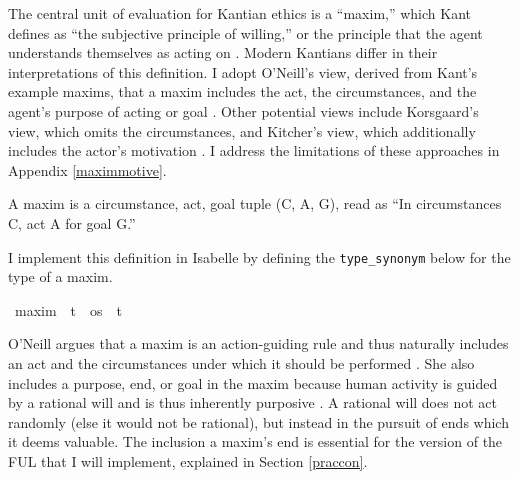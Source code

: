 \begin{isabellebody}
\begin{isamarkuptext}
The central unit of evaluation for Kantian ethics is a ``maxim,'' which Kant defines as ``the subjective 
principle of willing,'' or the principle that the agent understands themselves as acting on \citep[16, footnote 1]{groundwork}. 
Modern Kantians differ in their interpretations of this definition. I adopt O'Neill's view, derived from 
Kant's example maxims, that a maxim includes the act, the circumstances, and the agent's purpose of 
acting or goal \citep{actingonprinciple}. Other potential views include Korsgaard's view, which omits 
the circumstances, and Kitcher's view, which additionally includes the actor's motivation \citep{actingforareason, kitcher}. I 
address the limitations of these approaches in Appendix \ref{maximmotive}.


\begin{definition}[Maxim]
    A maxim is a circumstance, act, goal tuple (C, A, G), read as ``In circumstances C, act A for goal G.''
\end{definition}

I implement this definition in Isabelle by defining the \texttt{type\_synonym} below for the type
of a maxim.%
\end{isamarkuptext}\isamarkuptrue%
\isamarkupfalse%
\ maxim\ {\isacharequal}\ {\isachardoublequoteopen}{\isacharparenleft}t\ {\isacharasterisk}\ os\ {\isacharasterisk}\ t{\isacharparenright}{\isachardoublequoteclose}\isanewline
%
%
\begin{isamarkuptext}%
O'Neill argues that a maxim 
is an action-guiding rule and thus naturally includes an act and the circumstances under which 
it should be performed \citep[37]{actingonprinciple}. 
She also includes a purpose, end, or goal in the maxim because human activity is guided by a rational will
and is thus inherently purposive \citep[40]{groundwork}. A rational will does not act randomly (else it would not be rational), 
but instead in the pursuit of ends which it deems valuable. The inclusion a maxim's end is essential 
for the version of the FUL that I will implement, explained in Section \ref{praccon}.


\end{isamarkuptext}
\end{isabellebody}

